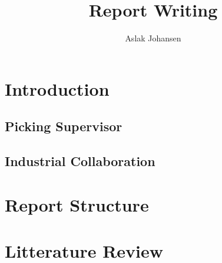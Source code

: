 \documentclass[a4paper]{memoir}
\title{Report Writing \\ \scalebox{0.85}{for Software BSc and MSc Projects}}
\author{Aslak Johansen}
\begin{document}
\maketitle
\tableofcontents

\chapter{Introduction}

\section{Picking Supervisor}

\section{Industrial Collaboration}

\chapter{Report Structure}

\chapter{Litterature Review}
\end{document}
